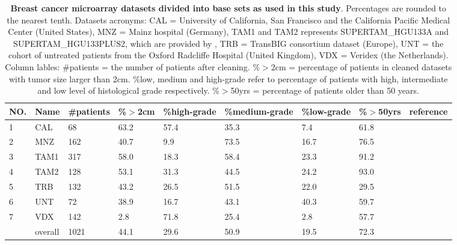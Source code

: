 \documentclass{bioinfo}
\begin{document}
\begin{table}[!t]
    \begin{tabular*}{1\textwidth}{@{\extracolsep{\fill}}lllllllll}
      NO. & Name & \#patients & \%$>$2cm &  \%high-grade & \%medium-grade & \%low-grade & \%$>$50yrs  &reference\\
      \hline
      1 & CAL & 68 & 63.2  & 57.4 & 35.3 & 7.4 & 61.8 & \citet{chin2006genomic} \\ %
       \hline
      2 & MNZ & 162 & 40.7  & 9.9 & 73.5 & 16.7 & 76.5 & \citet{schmidt2008humoral} \\ %
      \hline
      3 & TAM1 & 317 & 58.0  & 18.3 & 58.4 & 23.3 & 91.2 & \citet{foekens2006multicenter}\\%
       \hline
      4 & TAM2 & 128 & 53.1  & 31.3 & 44.5 & 24.2 & 93.0 & \citet{symmans2010genomic}\\%
       \hline
      5 & TRB  & 132 & 43.2  & 26.5 & 51.5 & 22.0 & 29.5 & \citet{desmedt2007strong} \\%
       \hline
      6 & UNT  & 72 & 38.9  & 16.7& 43.1 & 40.3 & 59.7 & \citet{sotiriou2006gene} \\%
       \hline
      7 & VDX  & 142 & 2.8 & 71.8 & 25.4 & 2.8 & 57.7 & \citet{minn2007lung} \\%
       \hline
      \quad & overall & 1021 & 44.1 & 29.6 & 50.9 & 19.5 & 72.3 &  \quad \\
      \hline
    \end{tabular*}
    \caption{\textbf{Breast cancer microarray datasets divided into
        base sets as used in this study}. Percentages are rounded to the nearest tenth. Datasets
      acronyms: CAL = University of California,
      San Francisco and the California Pacific Medical Center (United
      States), MNZ = Mainz hospital (Germany), TAM1 and TAM2 represents
      SUPERTAM\_HGU133A and SUPERTAM\_HGU133PLUS2, which are provided by \citet{Haibe-Kains2012}, 
      TRB = TransBIG consortium dataset (Europe), UNT = the cohort of
      untreated patients from the Oxford Radcliffe Hospital (United
      Kingdom), VDX = Veridex (the Netherlands). Column lables:
      \#patients = the number of patients after cleaning. \%$>$2cm =
      percentage of patients in cleaned datasets with tumor size
      larger than 2cm. \%low, medium and high-grade refer to percentage
      of patients with high, intermediate and low level of histological grade
      respectively. \%$>$50yrs = percentage of patients older than 50 years.}
    \label{table-datasets}
  \end{table}
  
\end{document}
